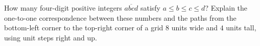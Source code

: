 How many four-digit positive integers $\overline{abcd}$ satisfy $a\le b\le c\le d$? Explain the one-to-one correspondence between these numbers and the paths from the bottom-left corner to the top-right corner of a grid $8$ units wide and $4$ units tall, using unit steps right and up.

